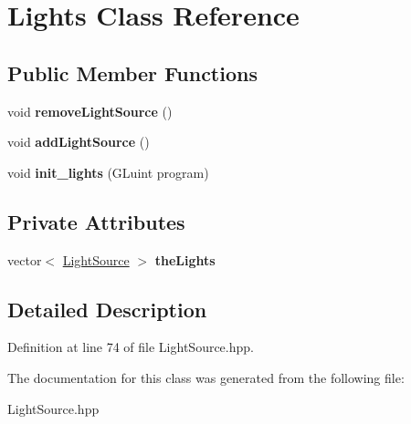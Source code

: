 \hypertarget{class_lights}{\section{\-Lights \-Class \-Reference}
\label{class_lights}
}
\subsection*{\-Public \-Member \-Functions}
\begin{DoxyCompactItemize}
\item 
\hypertarget{class_lights_a697efdeb33331a506a1a63a564f5f2e1}{void {\bfseries remove\-Light\-Source} ()}\label{class_lights_a697efdeb33331a506a1a63a564f5f2e1}

\item 
\hypertarget{class_lights_a2b773cfaba5c662fb2a0344be70edc19}{void {\bfseries add\-Light\-Source} ()}\label{class_lights_a2b773cfaba5c662fb2a0344be70edc19}

\item 
\hypertarget{class_lights_a47639f6fd64056f15b9372b80f9ef117}{void {\bfseries init\-\_\-lights} (\-G\-Luint program)}\label{class_lights_a47639f6fd64056f15b9372b80f9ef117}

\end{DoxyCompactItemize}
\subsection*{\-Private \-Attributes}
\begin{DoxyCompactItemize}
\item 
\hypertarget{class_lights_a902e37f0512d3bf9771472fe564bdac1}{vector$<$ \hyperlink{class_light_source}{\-Light\-Source} $>$ {\bfseries the\-Lights}}\label{class_lights_a902e37f0512d3bf9771472fe564bdac1}

\end{DoxyCompactItemize}


\subsection{\-Detailed \-Description}


\-Definition at line 74 of file \-Light\-Source.\-hpp.



\-The documentation for this class was generated from the following file\-:\begin{DoxyCompactItemize}
\item 
\-Light\-Source.\-hpp\end{DoxyCompactItemize}
